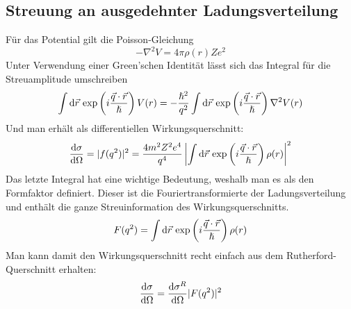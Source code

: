 \documentclass[Ex4_Zusammenfassung.tex]{subfiles}
\begin{document}
\subsection{Streuung an ausgedehnter Ladungsverteilung}
Für das Potential gilt die Poisson-Gleichung
\begin{equation}
- \nabla^2 V = 4 \pi \rho(r) Ze^2
\end{equation}
Unter Verwendung einer Green'schen Identität lässt sich das Integral für die Streuamplitude umschreiben 
\begin{equation}
\int \mathrm{d} \vec r \  \text{exp} \left(i \frac{ \vec q \cdot \vec r }{\hslash} \right) V(r) = - \frac{\hslash^2}{q^2} \int \mathrm{d} \vec r \  \text{exp} \left(i \frac{\vec q \cdot \vec r }{\hslash}\right) \nabla^2 V(r)
\end{equation}
Und man erhält als differentiellen Wirkungsquerschnitt:
\begin{equation}
\frac{\mathrm{d} \sigma}{\mathrm{d} \Omega} = |f(q^2)|^2 = \frac{4m^2Z^2e^4}{q^4} \left|\int \mathrm{d} \vec r \  \text{exp}\left(i \frac{ \vec q \cdot \vec r }{\hslash} \right) \rho(r)  \right|^2
\end{equation}
Das letzte Integral hat eine wichtige Bedeutung, weshalb man es als den Formfaktor definiert. Dieser ist die Fouriertransformierte der Ladungsverteilung und enthält die ganze Streuinformation des Wirkungsquerschnitts.
\begin{equation}
F(q^2) = \int \mathrm{d} \vec r \   \text{exp}\left(i \frac{ \vec q \cdot \vec r }{\hslash} \right) \rho(r)
\end{equation}
Man kann damit den Wirkungsquerschnitt recht einfach aus dem Rutherford-Querschnitt erhalten:
\begin{equation}
\frac{\mathrm{d} \sigma}{\mathrm{d} \Omega} = \frac{\mathrm{d} \sigma^R}{\mathrm{d} \Omega} |F(q^2)|^2
\end{equation}
\end{document}
